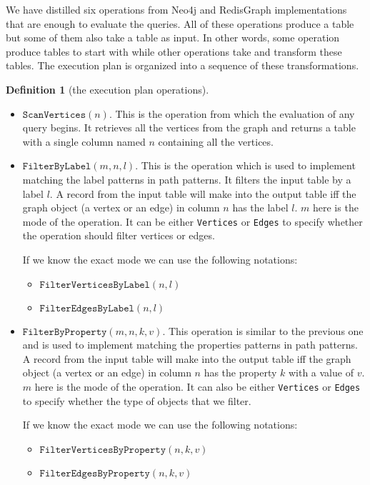 \documentclass[14pt]{constructor-thesis}
\theoremstyle{definition}
\newtheorem{definition}{Definition}
\begin{document}
We have distilled six operations from Neo4j and RedisGraph implementations that are enough to evaluate the queries. All of these operations produce a table but some of them also take a table as input. In other words, some operation produce tables to start with while other operations take and transform these tables. The execution plan is organized into a sequence of these transformations.

\begin{definition}[the execution plan operations] $ $
  \begin{itemize}
    \item $\texttt{ScanVertices}(n)$. This is the operation from which the evaluation of any query begins. It retrieves all the vertices from the graph and returns a table with a single column named $n$ containing all the vertices.

    \item $\texttt{FilterByLabel}(m, n, l)$. This is the operation which is used to implement matching the label patterns in path patterns. It filters the input table by a label $l$. A record from the input table will make into the output table iff the graph object (a vertex or an edge) in column $n$ has the label $l$. $m$ here is the mode of the operation. It can be either \texttt{Vertices} or \texttt{Edges} to specify whether the operation should filter vertices or edges.

    If we know the exact mode we can use the following notations:
    \begin{itemize}
      \item $\texttt{FilterVerticesByLabel}(n, l)$
      \item $\texttt{FilterEdgesByLabel}(n, l)$
    \end{itemize}

    \item $\texttt{FilterByProperty}(m, n, k, v)$. This operation is similar to the previous one and is used to implement matching the properties patterns in path patterns.
    A record from the input table will make into the output table iff the graph object (a vertex or an edge) in column $n$ has the property $k$ with a value of $v$. $m$ here is the mode of the operation. It can also be either \texttt{Vertices} or \texttt{Edges} to specify whether the type of objects that we filter.

    If we know the exact mode we can use the following notations:
    \begin{itemize}
      \item $\texttt{FilterVerticesByProperty}(n, k, v)$
      \item $\texttt{FilterEdgesByProperty}(n, k, v)$
    \end{itemize}


\end{itemize}
\end{definition}
\end{document}
